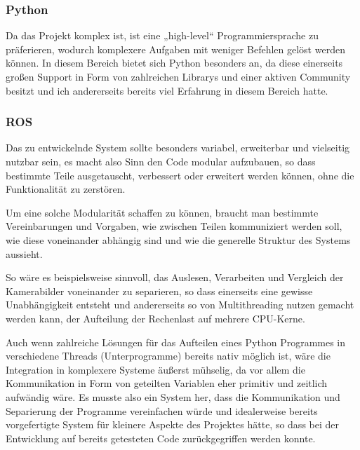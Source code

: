 \documentclass[12pt]{article}
\begin{document}
\subsubsection{Python}
Da das Projekt komplex ist, ist eine „high-level“ Programmiersprache zu präferieren, wodurch komplexere Aufgaben mit weniger Befehlen gelöst werden können. In diesem Bereich bietet sich Python besonders an, da diese einerseits großen Support in Form von zahlreichen Librarys und einer aktiven Community besitzt und ich andererseits bereits viel Erfahrung in diesem Bereich hatte. 

\subsubsection{ROS}
Das zu entwickelnde System sollte besonders variabel, erweiterbar und vielseitig nutzbar sein, es macht also Sinn den Code modular aufzubauen, so dass bestimmte Teile ausgetauscht, verbessert oder erweitert werden können, ohne die Funktionalität zu zerstören.  

Um eine solche Modularität schaffen zu können, braucht man bestimmte Vereinbarungen und Vorgaben, wie zwischen Teilen kommuniziert werden soll, wie diese voneinander abhängig sind und wie die generelle Struktur des Systems aussieht.  

So wäre es beispielsweise sinnvoll, das Auslesen, Verarbeiten und Vergleich der Kamerabilder voneinander zu separieren, so dass einerseits eine gewisse Unabhängigkeit entsteht und andererseits so von Multithreading nutzen gemacht werden kann, der Aufteilung der Rechenlast auf mehrere CPU-Kerne.  

Auch wenn zahlreiche Lösungen für das Aufteilen eines Python Programmes in verschiedene Threads (Unterprogramme) bereits nativ möglich ist, wäre die Integration in komplexere Systeme äußerst mühselig, da vor allem die Kommunikation in Form von geteilten Variablen eher primitiv und zeitlich aufwändig wäre. Es musste also ein System her, dass die Kommunikation und Separierung der Programme vereinfachen würde und idealerweise bereits vorgefertigte System für kleinere Aspekte des Projektes hätte, so dass bei der Entwicklung auf bereits getesteten Code zurückgegriffen werden konnte. 
\end{document}

